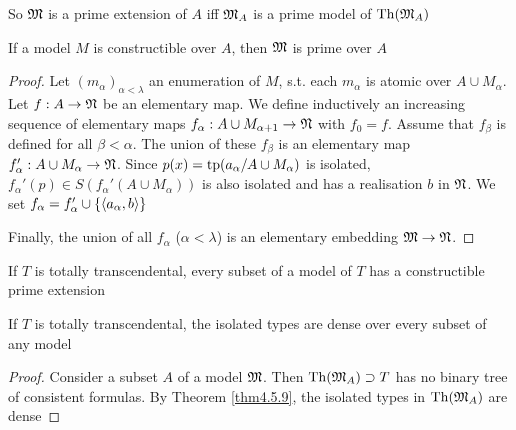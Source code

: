 \documentclass[11pt]{article}
\begin{document}
So \(\mathfrak{M}\) is a prime extension of \(A\) iff \(\mathfrak{M}_A\) is a prime model of \(\operatorname{Th}(\mathfrak{M}_A)\)

\begin{lemma}[]
\label{lemma5.3.2}
If a model \(M\) is constructible over \(A\), then \(\mathfrak{M}\) is prime over \(A\)
\end{lemma}

\begin{proof}
Let \((m_\alpha)_{\alpha<\lambda}\) an enumeration of \(M\), s.t. each \(m_\alpha\) is atomic over \(A\cup M_\alpha\).
Let \(f:A\to\mathfrak{N}\) be an elementary map. We define inductively an increasing sequence of elementary
maps \(f_\alpha:A\cup M_{\alpha+1}\to\mathfrak{N}\) with \(f_0=f\). Assume that \(f_\beta\) is defined for all \(\beta<\alpha\). The
union of these \(f_\beta\) is an elementary map \(f_\alpha':A\cup M_\alpha\to\mathfrak{N}\). Since \(p(x)=\operatorname{tp}(a_\alpha/A\cup M_\alpha)\) is
isolated, \(f_\alpha'(p)\in S(f_\alpha'(A\cup M_\alpha))\) is also isolated and has a realisation \(b\) in \(\mathfrak{N}\). We
set \(f_\alpha=f_\alpha'\cup\{\langle a_\alpha,b\rangle\}\)

Finally, the union of all \(f_\alpha\) (\(\alpha<\lambda\)) is an elementary embedding \(\mathfrak{M}\to\mathfrak{N}\).
\end{proof}

\begin{theorem}[]
\label{thm5.3.3}
If \(T\) is totally transcendental, every subset of a model of \(T\) has a constructible prime extension
\end{theorem}


\begin{lemma}[]
\label{lemma5.3.4}
If \(T\) is totally transcendental, the isolated types are dense over every subset of any model
\end{lemma}

\begin{proof}
Consider a subset \(A\) of a model \(\mathfrak{M}\). Then \(\operatorname{Th}(\mathfrak{M}_A)\supset T\) has no binary tree of consistent
formulas. By Theorem \ref{thm4.5.9}, the isolated types in \(\operatorname{Th}(\mathfrak{M}_A)\) are dense
\end{proof}
\end{document}
